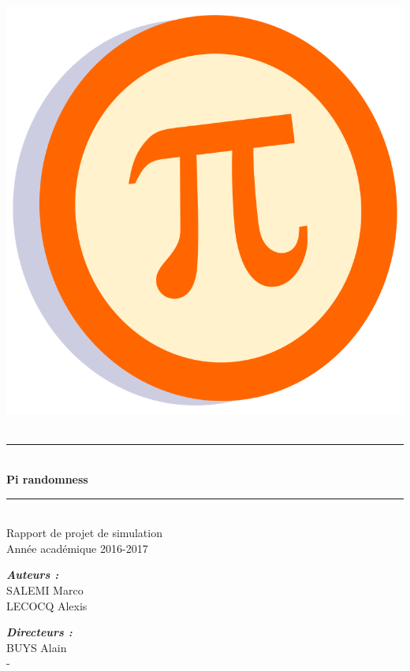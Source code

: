 \documentclass[10pt,a4paper]{article}
\newcommand{\HRule}{\rule{\linewidth}{0.5mm}}
\begin{document}
	\pagestyle{fancy}
	\fancyhf{}
	\cfoot{\thepage}
	
	\begin{titlepage}
		\begin{center}
			\includegraphics[scale=1.5]{images/pi.png}~\\[1.5cm]
			
			\HRule \\[0.5cm]
			{ \huge \bfseries Pi randomness\\[0.4cm] }
			\HRule \\[1.5cm]
			
			\Large{Rapport de projet de simulation}\\[2cm]
			
			\Large{Année académique 2016-2017}\\[2cm]
			
			\begin{minipage}{0.4\textwidth}
				\begin{flushleft} \large
					\emph{\textbf{Auteurs :}}\\
					SALEMI Marco\\
					LECOCQ Alexis
				\end{flushleft}
			\end{minipage}
			\begin{minipage}{0.4\textwidth}
				\begin{flushright} \large
					\emph{\textbf{Directeurs :}}\\
					BUYS Alain\\
					-\\
				\end{flushright}
			\end{minipage}
			

\end{center}
\end{titlepage}
\end{document}
